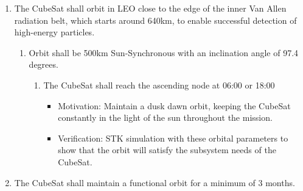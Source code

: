 \begin{enumerate}
\begin{enumerate}
\begin{enumerate}
\begin{itemize}
                    \item Motivation: The satellite will need to de-orbit whether or not communication is established in order to comply with safety standards
                    \item Verification: A test will be conducted before launch where contact will be severed with the failsafe to determine if it will deploy
                \end{itemize}
                \item The EoL system will be capable of activation in the event of a DoA scenario. 
                    \begin{itemize}
                        \item Motivation: The satellite will need to de-orbit even in the DoA scenario in order to comply with safety standards
                        \item Verification: A test will be conducted before launch where all external energy sources, such as the battery,  will be severed from the failsafe to determine if it will deploy
                    \end{itemize}
         \end{enumerate}
    \end{enumerate} %
    \item The CubeSat shall orbit in LEO close to the edge of the inner Van Allen radiation belt, which starts around 640km, to enable successful detection of high-energy particles.  
    \begin{enumerate}
        \item Orbit shall be 500km Sun-Synchronous with an inclination angle of 97.4 degrees.
        \begin{enumerate}
            \item The CubeSat shall reach the ascending node at 06:00 or 18:00
                \begin{itemize}
                        \item Motivation: Maintain a dusk dawn orbit, keeping the CubeSat constantly in the light of the sun throughout the mission.
                        \item Verification: STK simulation with these orbital parameters to show that the orbit will satisfy the subsystem needs of the CubeSat. 
                    \end{itemize}
        \end{enumerate}
    \end{enumerate} %
    \item The CubeSat shall maintain a functional orbit for a minimum of 3 months.

\end{enumerate}
